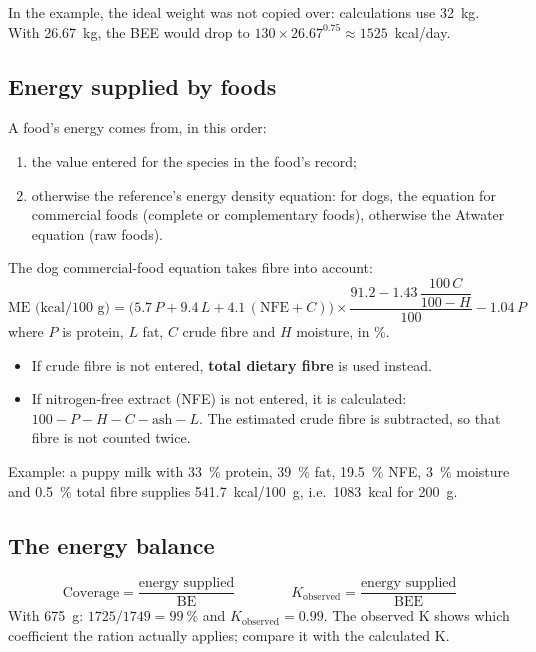 \documentclass[11pt,a4paper]{article}
\begin{document}
\begin{aretenir}
In the example, the ideal weight was not copied over: calculations use 32~kg. With 26.67~kg,
the BEE would drop to $130 \times 26.67^{0.75} \approx 1525$~kcal/day.
\end{aretenir}

\subsection{Energy supplied by foods}

A food's energy comes from, in this order:
\begin{enumerate}
  \item the value entered for the species in the food's record;
  \item otherwise the reference's energy density equation: for dogs, the equation for
        commercial foods (complete or complementary foods), otherwise the Atwater equation (raw
        foods).
\end{enumerate}
The dog commercial-food equation takes fibre into account:
\[
  \text{ME (kcal/100 g)} = \bigl(5.7\,P + 9.4\,L + 4.1\,(\text{NFE} + C)\bigr)
  \times \frac{91.2 - 1.43\,\dfrac{100\,C}{100 - H}}{100} - 1.04\,P
\]
where $P$ is protein, $L$ fat, $C$ crude fibre and $H$ moisture, in \%.
\begin{itemize}
  \item If crude fibre is not entered, \textbf{total dietary fibre} is used instead.
  \item If nitrogen-free extract (NFE) is not entered, it is calculated:
        $100 - P - H - C - \text{ash} - L$. The estimated crude fibre is subtracted, so that
        fibre is not counted twice.
\end{itemize}
Example: a puppy milk with 33~\% protein, 39~\% fat, 19.5~\% NFE, 3~\% moisture and 0.5~\%
total fibre supplies 541.7~kcal/100~g, i.e.\ 1083~kcal for 200~g.

\subsection{The energy balance}

\[
  \text{Coverage} = \frac{\text{energy supplied}}{\text{BE}}
  \qquad\qquad
  K_{\text{observed}} = \frac{\text{energy supplied}}{\text{BEE}}
\]
With 675~g: $1725 / 1749 = 99~\%$ and $K_{\text{observed}} = 0.99$. The observed K shows which
coefficient the ration actually applies; compare it with the calculated K.
\end{document}
